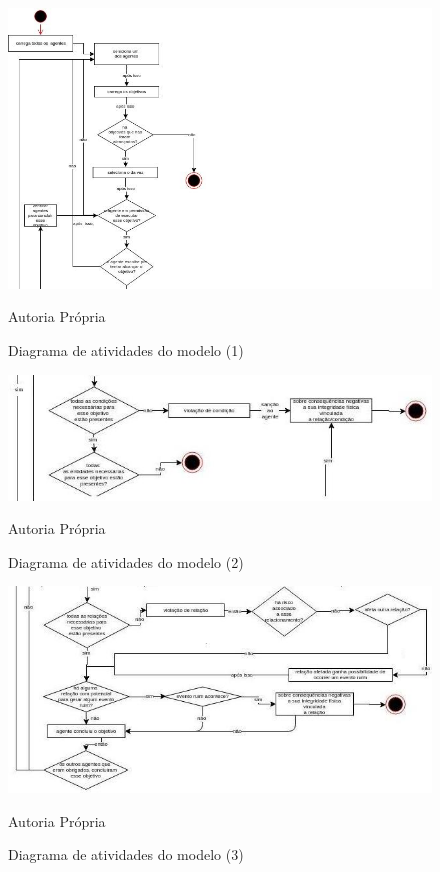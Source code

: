 \begin{figure}[H]
  \centering
  \caption{Diagrama de atividades do modelo (1)}
  \includegraphics[width=1.5\linewidth]{figure/diag1.jpg} 
  \begin{center}
    Autoria Própria
  \end{center}
  \label{atividiagram1}
\end{figure}


\begin{figure}[H]
  \centering
  \caption{Diagrama de atividades do modelo (2)}
  \includegraphics[width=1.1\linewidth]{figure/diag2.jpg} 
  \begin{center}
    Autoria Própria
  \end{center}
  \label{atividiagram2}
\end{figure}

\begin{figure}[H]
  \centering
  \caption{Diagrama de atividades do modelo (3)}
  \includegraphics[width=1.1\linewidth]{figure/diag3.jpg} 
  \begin{center}
    Autoria Própria
  \end{center}
  \label{atividiagram3}
\end{figure}


